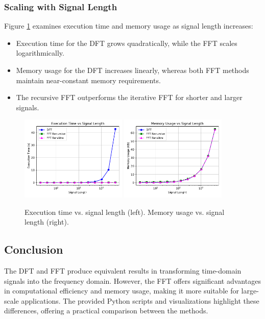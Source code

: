 \documentclass[12pt, a4paper]{report}
\begin{document}
\subsubsection{Scaling with Signal Length}
Figure \ref{fig:scaling_comparison} examines execution time and memory usage as signal length increases:
\begin{itemize}
	\item Execution time for the \ac{DFT} grows quadratically, while the \ac{FFT} scales logarithmically.
	\item Memory usage for the \ac{DFT} increases linearly, whereas both \ac{FFT} methods maintain near-constant memory requirements.
	\item The recursive \ac{FFT} outperforms the iterative \ac{FFT} for shorter and larger signals.
\end{itemize}

\begin{figure}[h!]
	\centering
	\includegraphics[width=0.45\textwidth]{figures/computional_time_cmp.pdf}
	\includegraphics[width=0.45\textwidth]{figures/memory_usage_cmp.pdf}
	\caption{Execution time vs. signal length (left). Memory usage vs. signal length (right).}
	\label{fig:scaling_comparison}
\end{figure}

\subsection{Conclusion}
The \ac{DFT} and \ac{FFT} produce equivalent results in transforming time-domain signals into the frequency domain. However, the \ac{FFT} offers significant advantages in computational efficiency and memory usage, making it more suitable for large-scale applications. The provided Python scripts and visualizations highlight these differences, offering a practical comparison between the methods.
\end{document}
